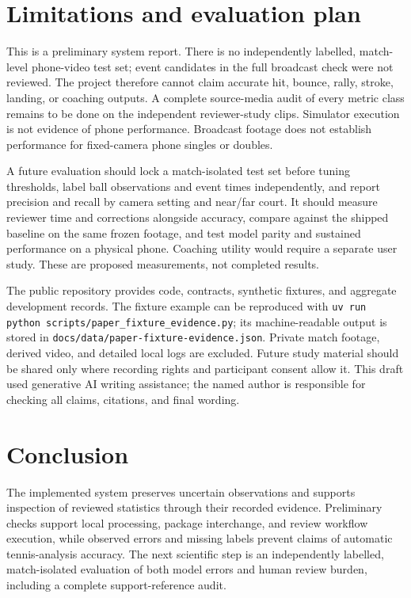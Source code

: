 \documentclass[10pt]{article}
\begin{document}
\section{Limitations and evaluation plan}
This is a preliminary system report. There is no independently labelled, match-level phone-video test set; event candidates in the full broadcast check were not reviewed. The project therefore cannot claim accurate hit, bounce, rally, stroke, landing, or coaching outputs. A complete source-media audit of every metric class remains to be done on the independent reviewer-study clips. Simulator execution is not evidence of phone performance. Broadcast footage does not establish performance for fixed-camera phone singles or doubles.

A future evaluation should lock a match-isolated test set before tuning thresholds, label ball observations and event times independently, and report precision and recall by camera setting and near/far court. It should measure reviewer time and corrections alongside accuracy, compare against the shipped baseline on the same frozen footage, and test model parity and sustained performance on a physical phone. Coaching utility would require a separate user study. These are proposed measurements, not completed results.

The public repository provides code, contracts, synthetic fixtures, and aggregate development records. The fixture example can be reproduced with \texttt{uv run python scripts/paper\_fixture\_evidence.py}; its machine-readable output is stored in \texttt{docs/data/paper-fixture-evidence.json}. Private match footage, derived video, and detailed local logs are excluded. Future study material should be shared only where recording rights and participant consent allow it. This draft used generative AI writing assistance; the named author is responsible for checking all claims, citations, and final wording.

\section{Conclusion}
The implemented system preserves uncertain observations and supports inspection of reviewed statistics through their recorded evidence. Preliminary checks support local processing, package interchange, and review workflow execution, while observed errors and missing labels prevent claims of automatic tennis-analysis accuracy. The next scientific step is an independently labelled, match-isolated evaluation of both model errors and human review burden, including a complete support-reference audit.
\end{document}
